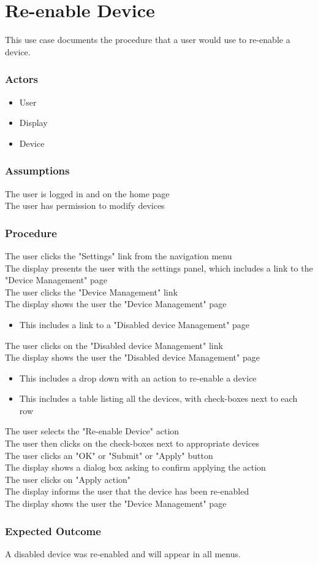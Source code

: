 \section{Re-enable Device}

This use case documents the procedure that a user would use to re-enable a device.

\subsubsection{Actors}
\begin{itemize}
	\item User
	\item Display
	\item Device
\end{itemize}

\subsubsection{Assumptions}

The user is logged in and on the home page\\
The user has permission to modify devices

\subsubsection{Procedure}

The user clicks the "Settings" link from the navigation menu\\
The display presents the user with the settings panel, which includes a link to the "Device Management" page\\
The user clicks the "Device Management" link\\
The display shows the user the "Device Management" page
\begin{itemize}
	\item This includes a link to a "Disabled device Management" page
\end{itemize}
The user clicks on the "Disabled device Management" link\\
The display shows the user the "Disabled device Management" page
\begin{itemize}
	\item This includes a drop down with an action to re-enable a device
	\item This includes a table listing all the devices, with check-boxes next to each row
\end{itemize}
The user selects the "Re-enable Device" action\\
The user then clicks on the check-boxes next to appropriate devices\\
The user clicks an "OK" or "Submit" or "Apply" button\\
The display shows a dialog box asking to confirm applying the action\\
The user clicks on "Apply action" \\
The display informs the user that the device has been re-enabled\\
The display shows the user the "Device Management" page

\subsubsection{Expected Outcome}

A disabled device was re-enabled and will appear in all menus.